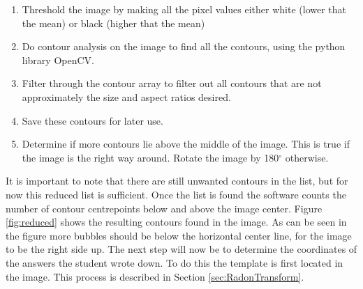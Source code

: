 \begin{enumerate}
\item Threshold the image by making all the pixel values either white (lower that the mean) or black (higher that the mean)
\item Do contour analysis on the image to find all the contours, using the python library OpenCV.
\item Filter through the contour array to filter out all contours that are not approximately the size and aspect ratios desired.
\item Save these contours for later use.
\item Determine if more contours lie above the middle of the image. This is true if the image is the right way around. Rotate the image by 180$^{\circ}$ otherwise.
\end{enumerate}

It is important to note that there are still unwanted contours in the list, but for now this reduced list is sufficient. Once the list is found the software counts the number of contour centrepoints below and above the image center. Figure \ref{fig:reduced} shows the resulting contours found in the image. As can be seen in the figure more bubbles should be below the horizontal center line, for the image to be the right side up. The next step will now be to determine the coordinates of the answers the student wrote down. To do this the template is first located in the image. This process is described in Section \ref{sec:RadonTransform}.


